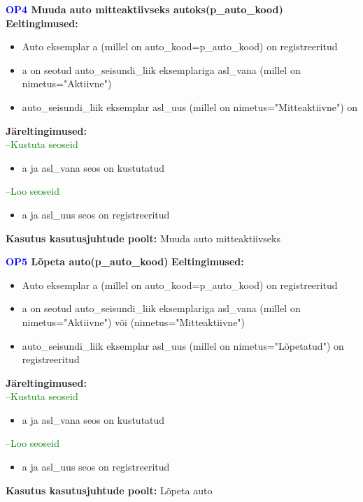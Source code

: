 \textbf{\textcolor{blue}{OP4} Muuda auto mitteaktiivseks autoks(p\_auto\_kood)}
\textbf{Eeltingimused:}
\begin{itemize}
	\item Auto eksemplar a (millel on auto\_kood=p\_auto\_kood) on registreeritud
	\item a on seotud auto\_seisundi\_liik eksemplariga asl\_vana (millel on nimetus="Aktiivne")
	\item auto\_seisundi\_liik eksemplar asl\_uus (millel on nimetus="Mitteaktiivne") on 
\end{itemize}
\textbf{Järeltingimused:} \\
\textcolor{green}{--Kustuta seoseid}
\begin{itemize}
	\item a ja asl\_vana seos on kustutatud
\end{itemize}
\textcolor{green}{--Loo seoseid}
\begin{itemize}
	\item a ja asl\_uus seos on registreeritud
\end{itemize}
\textbf{Kasutus kasutusjuhtude poolt:} Muuda auto mitteaktiivseks \\ \hfill

\textbf{\textcolor{blue}{OP5} Lõpeta auto(p\_auto\_kood)}
\textbf{Eeltingimused:}
\begin{itemize}
	\item Auto eksemplar a (millel on auto\_kood=p\_auto\_kood) on registreeritud
	\item a on seotud auto\_seisundi\_liik eksemplariga asl\_vana (millel on nimetus="Aktiivne") või (nimetus="Mitteaktiivne")
	\item auto\_seisundi\_liik eksemplar asl\_uus (millel on nimetus="Lõpetatud") on registreeritud
\end{itemize}
\textbf{Järeltingimused:} \\
\textcolor{green}{--Kustuta seoseid}
\begin{itemize}
	\item a ja asl\_vana seos on kustutatud
\end{itemize}
\textcolor{green}{--Loo seoseid}
\begin{itemize}
	\item a ja asl\_uus seos on registreeritud
\end{itemize}
\textbf{Kasutus kasutusjuhtude poolt:} Lõpeta auto \\ \hfill

